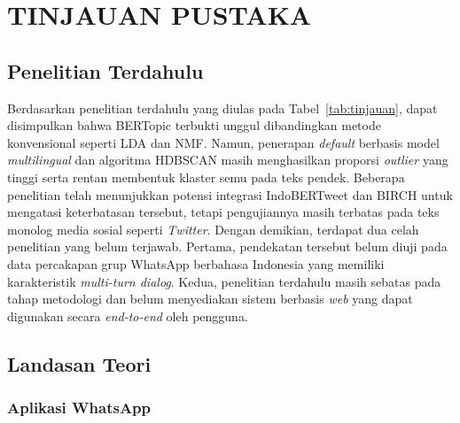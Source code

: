 %

\chapter{TINJAUAN PUSTAKA}

\section{Penelitian Terdahulu}
\label{sec:literature-related}



Berdasarkan penelitian terdahulu yang diulas pada Tabel~\ref{tab:tinjauan}, dapat disimpulkan bahwa BERTopic terbukti unggul dibandingkan metode konvensional seperti LDA dan NMF. Namun, penerapan \textit{default} berbasis model \textit{multilingual} dan algoritma HDBSCAN masih menghasilkan proporsi \textit{outlier} yang tinggi serta rentan membentuk klaster semu pada teks pendek. Beberapa penelitian telah menunjukkan potensi integrasi IndoBERTweet dan BIRCH untuk mengatasi keterbatasan tersebut, tetapi pengujiannya masih terbatas pada teks monolog media sosial seperti \textit{Twitter}. Dengan demikian, terdapat dua celah penelitian yang belum terjawab. Pertama, pendekatan tersebut belum diuji pada data percakapan grup WhatsApp berbahasa Indonesia yang memiliki karakteristik \textit{multi-turn dialog}. Kedua, penelitian terdahulu masih sebatas pada tahap metodologi dan belum menyediakan sistem berbasis \textit{web} yang dapat digunakan secara \textit{end-to-end} oleh pengguna.

\section{Landasan Teori}
\label{sec:literature-theory}

\subsection{Aplikasi WhatsApp}
\label{subsec:theory-first}

